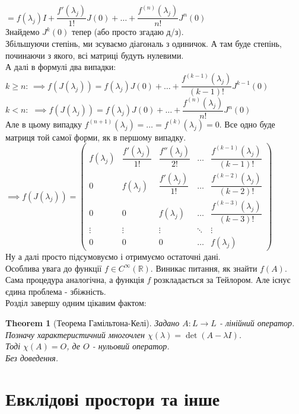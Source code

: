 \documentclass[a4paper, 10pt]{article}
\theoremstyle{theoremdd}
\newtheorem{theorem}{Theorem}[subsection]
\theoremstyle{theoremdd}
\theoremstyle{theoremdd}
\theoremstyle{theoremdd}
\theoremstyle{theoremdd}
\theoremstyle{theoremdd}
\theoremstyle{theoremdd}
\theoremstyle{theoremdd}
\begin{document}
$\boxed{=} f(\lambda_j)I + \dfrac{f'(\lambda_j)}{1!}J(0) + \dots + \dfrac{f^{(n)}(\lambda_j)}{n!}J^n(0)$\\
Знайдемо $J^k(0)$ тепер (або просто згадаю д/з).\\
Збільшуючи степінь, ми зсуваємо діагональ з одиничок. А там буде степінь, починаючи з якого, всі матриці будуть нулевими.\\
А далі в формулі два випадки:\\
$k \geq n$:
$\implies f(J(\lambda_j)) = f(\lambda_j)J(0) + \dots + \dfrac{f^{(k-1)}(\lambda_j)}{(k-1)!}J^{k-1}(0)$\\
$k < n:$
$\implies f(J(\lambda_j)) = f(\lambda_j)J(0) + \dots + \dfrac{f^{(n)}(\lambda_j)}{n!}J^{n}(0)$\\
Але в цьому випадку $f^{(n+1)}(\lambda_j) = \dots = f^{(k)}(\lambda_j) = 0$. Все одно буде матриця той самої форми, як в першому випадку.\\
$\implies f(J(\lambda_j)) = \begin{pmatrix}
 f(\lambda_j) & \dfrac{f'(\lambda_j)}{1!} & \dfrac{f''(\lambda_j)}{2!} & \dots & \dfrac{f^{(k-1)}(\lambda_j)}{(k-1)!} \\
 0 & f(\lambda_j) & \dfrac{f'(\lambda_j)}{1!} & \dots & \dfrac{f^{(k-2)}(\lambda_j)}{(k-2)!} \\
 0 & 0 & f(\lambda_j) & \dots & \dfrac{f^{(k-3)}(\lambda_j)}{(k-3)!} \\
 \vdots & \vdots & \vdots & \ddots & \vdots \\
 0 & 0 & 0 & \dots & f(\lambda_j) 
\end{pmatrix}$\\
Ну а далі просто підсумовуємо і отримуємо остаточні дані.
\bigskip \\
Особлива увага до функції $f \in C^{\infty}(\mathbb{R})$. Виникає питання, як знайти $f(A)$. Сама процедура аналогічна, а функція $f$ розкладається за Тейлором. Але існує єдина проблема - збіжність.
\bigskip \\
Розділ завершу одним цікавим фактом:
\begin{theorem}[Теорема Гамільтона-Келі]
Задано $A: L \to L$ - лінійний оператор. Позначу характеристичний многочлен $\chi (\lambda) = \det (A-\lambda I)$.\\
Тоді $\chi (A) = O$, де $O$ - нульовий оператор.\\
\textit{Без доведення.}
\end{theorem}

\newpage
\section{Евклідові простори та інше}
\end{document}
